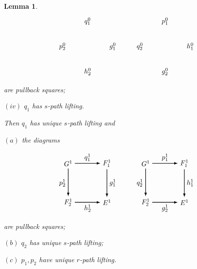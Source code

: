 \documentclass[10pt,a4paper]{amsart}
\newtheorem{lem}{Lemma}
\begin{document}
\begin{lem}
\[\begin{tikzpicture}[scale=1]
\node at (1,0.3) {$q_1^0$};
\node at (5,0.3) {$p_1^0$};
\node at (1,-2.3) {$h_2^0$};
\node at (5,-2.3) {$g_2^0$};

\node at (-0.3,-1) {$p_2^0$};
\node at (2.3,-1) {$g_1^0$};
\node at (3.7,-1) {$q_2^0$};
\node at (6.3,-1) {$h_1^0$};
\end{tikzpicture}
\]
are pullback squares;

$(iv)$ $q_1$ has $s$-path lifting. 

Then $q_1$ has unique $s$-path lifting and 

$(a)$ the diagrams 

\[
\begin{tikzpicture}[scale=1]
\node[] (A1) at (0,0) {$G^1$};
\node[] (A2) at (2,0) {$F_1^1$};
\node[] (A3) at (4,0) {$G^1$};
\node[] (A4) at (6,0) {$F_1^1$};

\node[] (B1) at (0,-2) {$F_2^1$};
\node[] (B2) at (2,-2) {$E^1$};
\node[] (B3) at (4,-2) {$F_2^1$};
\node[] (B4) at (6,-2) {$E^1$};


\path[->, >=latex,thick] (A1) edge [] node[]{} (A2);
\path[->, >=latex,thick] (B1) edge [] node[]{} (B2);
\path[->, >=latex,thick] (A3) edge [] node[]{} (A4);
\path[->, >=latex,thick] (B3) edge [] node[]{} (B4);

\path[->, >=latex,thick] (A1) edge [] node[]{} (B1);
\path[->, >=latex,thick] (A2) edge [] node[]{} (B2);
\path[->, >=latex,thick] (A3) edge [] node[]{} (B3);
\path[->, >=latex,thick] (A4) edge [] node[]{} (B4);

\node at (1,0.3) {$q_1^1$};
\node at (5,0.3) {$p_1^1$};
\node at (1,-2.3) {$h_2^1$};
\node at (5,-2.3) {$g_2^1$};

\node at (-0.3,-1) {$p_2^1$};
\node at (2.3,-1) {$g_1^1$};
\node at (3.7,-1) {$q_2^1$};
\node at (6.3,-1) {$h_1^1$};
\end{tikzpicture}
\]
are pullback squares;

$(b)$ $q_2$ has unique $s$-path lifting;

$(c)$ $p_1,p_2$ have unique $r$-path lifting.
\end{lem}
\end{document}
